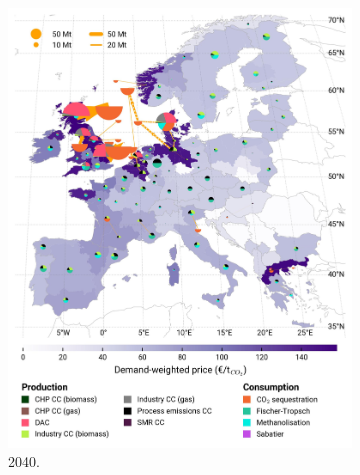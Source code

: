 \documentclass[preprint,12pt,sort&compress]{elsarticle}
\begin{document}
\begin{figure}[htbp]
\begin{subfigure}[t]{0.4\textwidth}
      \includegraphics[width=1\textwidth,trim=0cm 3.2cm 0cm 0cm, clip]{maps/pcipmi/base_s_adm___2040-balance_map_co2_stored} 
      \vspace{-0.5cm}
      \caption{ 2040.}
      \label{fig:PCI_lt_2040_co2}
  \end{subfigure}
  \begin{subfigure}[t]{0.4\textwidth}
      \vspace{0pt}

\end{subfigure}
\end{figure}
\end{document}
